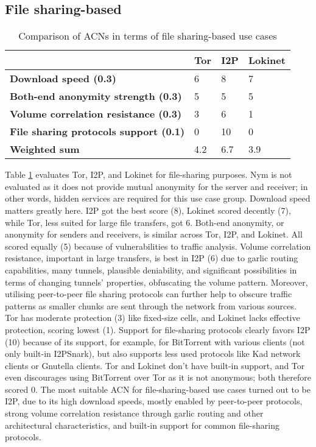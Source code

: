 \subsection{File sharing-based}

\begin{table}[!ht]
\caption{Comparison of ACNs in terms of file sharing-based use cases}
\label{tab:file_sharing_uc}
\small
\begin{tabular}{|p{}|p{}|p{}|p{}|}
\hline
\textbf{} & \textbf{Tor} & \textbf{I2P} & \textbf{Lokinet} \\
\hline
\textbf{Download speed (0.3)} & 6 & 8 & 7 \\
\hline
\textbf{Both-end anonymity strength (0.3)} & 5 & 5 & 5 \\
\hline
\textbf{Volume correlation resistance (0.3)} & 3 & 6 & 1 \\
\hline
\textbf{File sharing protocols support (0.1)} & 0 & 10 & 0 \\
\hline
\textbf{Weighted sum} & 4.2 & 6.7 & 3.9 \\
\hline
\end{tabular}
\end{table}

Table \ref{tab:file_sharing_uc} evaluates Tor, I2P, and Lokinet for file-sharing purposes. Nym is not evaluated as it does not provide mutual anonymity for the server and receiver; in other words, hidden services are required for this use case group.
Download speed matters greatly here. I2P got the best score (8), Lokinet scored decently (7), while Tor, less suited for large file transfers, got 6.
Both-end anonymity, or anonymity for senders and receivers, is similar across Tor, I2P, and Lokinet. All scored equally (5) because of vulnerabilities to traffic analysis.
Volume correlation resistance, important in large transfers, is best in I2P (6) due to garlic routing capabilities, many tunnels, plausible deniability, and significant possibilities in terms of changing tunnels' properties, obfuscating the volume pattern. Moreover, utilising peer-to-peer file sharing protocols can further help to obscure traffic patterns as smaller chunks are sent through the network from various sources. Tor has moderate protection (3) like fixed-size cells, and Lokinet lacks effective protection, scoring lowest (1).
Support for file-sharing protocols clearly favors I2P (10) because of its support, for example, for BitTorrent with various clients (not only built-in I2PSnark), but also supports less used protocols like Kad network clients or Gnutella clients. Tor and Lokinet don't have built-in support, and Tor even discourages using BitTorrent over Tor as it is not anonymous; both therefore scored 0.
The most suitable ACN for file-sharing-based use cases turned out to be I2P, due to its high download speeds, mostly enabled by peer-to-peer protocols, strong volume correlation resistance through garlic routing and other architectural characteristics, and built-in support for common file-sharing protocols.

